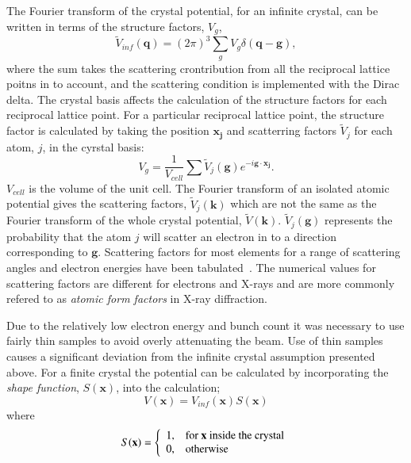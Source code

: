 The Fourier transform of the crystal potential, for an infinite crystal, can be written in terms of the structure factors, $V_g$,
\begin{equation}
\tilde{V}_{inf}(\mathbf{q}) = (2\pi)^3 \sum_g V_g \delta(\mathbf{q} - \mathbf{g}),
\end{equation}
where the sum takes the scattering crontribution from all the reciprocal lattice poitns in to account, and the scattering condition is implemented with the Dirac delta.
The crystal basis affects the calculation of the structure factors for each reciprocal lattice point.
For a particular reciprocal lattice point, the structure factor is calculated by taking the position $\mathbf{x_j}$ and scatterring factors $\tilde{V}_j$ for each atom, $j$, in the cyrstal basis:
\begin{equation}
V_g = \frac{1}{V_{cell}}\sum\tilde{V}_j(\mathbf{g})e^{-i\mathbf{g}\cdot\mathbf{x_j}}.
\end{equation}
$V_{cell}$ is the volume of the unit cell. The Fourier transform of an isolated atomic potential gives the scattering factors, $\tilde{V}_j(\mathbf{k})$ which are not the same as the Fourier transform of the whole crystal potential, $\tilde{V}(\mathbf{k})$.
$\tilde{V}_j(\mathbf{g})$ represents the probability that the atom $j$ will scatter an electron in to a direction corresponding to $\mathbf{g}$.
Scattering factors for most elements for a range of scattering angles and electron energies have been tabulated~\cite{peng_electron_1999}.
The numerical values for scattering factors are different for electrons and X-rays and are more commonly refered to as \emph{atomic form factors} in X-ray diffraction.

Due to the relatively low electron energy and bunch count it was necessary to use fairly thin samples to avoid overly attenuating the beam.
Use of thin samples causes a significant deviation from the infinite crystal assumption presented above.
For a finite crystal the potential can be calculated by incorporating the \emph{shape function}, $S(\mathbf{x})$, into the calculation;
\begin{equation}
V(\mathbf{x}) = V_{inf}(\mathbf{x})S(\mathbf{x})
\end{equation}
where
\begin{equation}
S(\mathbf{x}) = \left\{\begin{array}{l l}
1, & \text{for $\mathbf{x}$ inside the crystal} \\
0, & \text{otherwise}
\end{array}
\right.
\end{equation}

